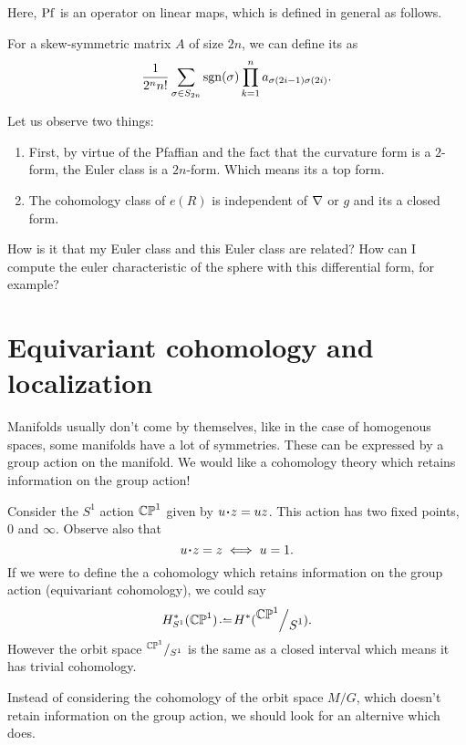 \documentclass[12pt]{memoir}
\begin{document}
Here, $\operatorname{Pf}$ is an operator on linear maps, which is defined in general as follows.

\begin{Def}
    For a skew-symmetric matrix $A$ of size $2n$, we can define its  as 
    $$\frac{1}{2^nn!}\sum_{\sigma\in S_{2n}}\operatorname{sgn}(\sigma)\prod_{k=1}^{n}a_{\sigma(2i-1)\sigma(2i)}.$$
\end{Def}

\begin{Rmk}
    Let us observe two things:
    \begin{enumerate}
        \item First, by virtue of the Pfaffian and the fact that the curvature form is a $2$-form, the Euler class is a $2n$-form. Which means its a top form.
        \item The cohomology class of $e(R)$ is independent of ${\mathbf{\nabla}}$ or $g$ and its a closed form.
    \end{enumerate}
\end{Rmk}

\begin{Qn}
How is it that my Euler class and this Euler class are related? How can I compute the euler characteristic of the sphere with this differential form, for example?
\end{Qn}

\section{Equivariant cohomology and localization}

Manifolds usually don't come by themselves, like in the case of homogenous spaces, some manifolds have a lot of symmetries. These can be expressed by a group action on the manifold. We would like a cohomology theory which retains information on the group action!

\begin{Ex}
    Consider the $S^1$ action $\mathbb{CP}^1$ given by $u\. z=uz$. This action has two fixed points, $0$ and $\infty$. Observe also that 
    $$u\.z=z\iff u=1.$$
    If we were to define the a cohomology which retains information on the group action (equivariant cohomology), we could say 
    $$H_{S^1}^\ast(\bCP^1)\defeq H^\ast(\quot{\bCP^1}{S^1}).$$
    However the orbit space $\quot{\bCP^1}{S^1}$ is the same as a closed interval which means it has trivial cohomology.
\end{Ex}

Instead of considering the cohomology of the orbit space $M/G$, which doesn't retain information on the group action, we should look for an alternive which does.
\end{document}
